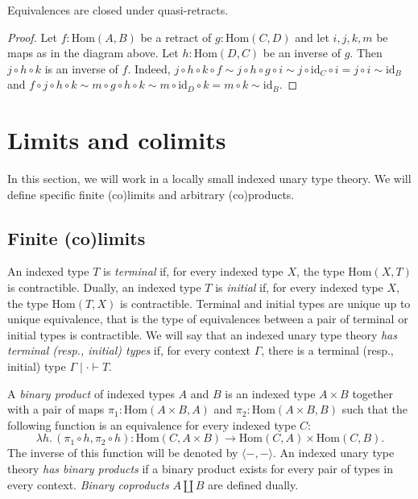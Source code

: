 \documentclass[reqno]{amsart}
\theoremstyle{definition}
\theoremstyle{remark}
\newcommand{\ob}{}
\newcommand{\fs}[1]{\mathrm{#1}}
\newcommand{\Hom}{\fs{Hom}}
\newcommand{\id}{\fs{id}}
\numberwithin{figure}{section}
\begin{document}
\begin{prop}
Equivalences are closed under quasi-retracts.
\end{prop}
\begin{proof}
Let $f : \Hom(A,B)$ be a retract of $g : \Hom(C,D)$ and let $i,j,k,m$ be maps as in the diagram above.
Let $h : \Hom(D,C)$ be an inverse of $g$.
Then $j \circ h \circ k$ is an inverse of $f$.
Indeed, $j \circ h \circ k \circ f \sim j \circ h \circ g \circ i \sim j \circ \id_C \circ i = j \circ i \sim \id_B$ and
$f \circ j \circ h \circ k \sim m \circ g \circ h \circ k \sim m \circ \id_D \circ k = m \circ k \sim \id_B$.
\end{proof}

\section{Limits and colimits}

In this section, we will work in a locally small indexed unary type theory.
We will define specific finite (co)limits and arbitrary (co)products.

\subsection{Finite (co)limits}

An indexed type $T$ is \emph{terminal} if, for every indexed type $X$, the type $\Hom(X,T)$ is contractible.
Dually, an indexed type $T$ is \emph{initial} if, for every indexed type $X$, the type $\Hom(T,X)$ is contractible.
Terminal and initial types are unique up to unique equivalence, that is the type of equivalences between a pair of terminal or initial types is contractible.
We will say that an indexed unary type theory \emph{has terminal (resp., initial) types} if, for every context $\Gamma$, there is a terminal (resp., initial) type $\Gamma \mid \cdot \vdash T \ob$.

A \emph{binary product} of indexed types $A$ and $B$ is an indexed type $A \times B$ together with a pair of maps $\pi_1 : \Hom(A \times B, A)$ and $\pi_2 : \Hom(A \times B, B)$
such that the following function is an equivalence for every indexed type $C$:
\[ \lambda h.\,(\pi_1 \circ h, \pi_2 \circ h) : \Hom(C, A \times B) \to \Hom(C,A) \times \Hom(C,B). \]
The inverse of this function will be denoted by $\langle -, - \rangle$.
An indexed unary type theory \emph{has binary products} if a binary product exists for every pair of types in every context.
\emph{Binary coproducts} $A \amalg B$ are defined dually.
\end{document}
